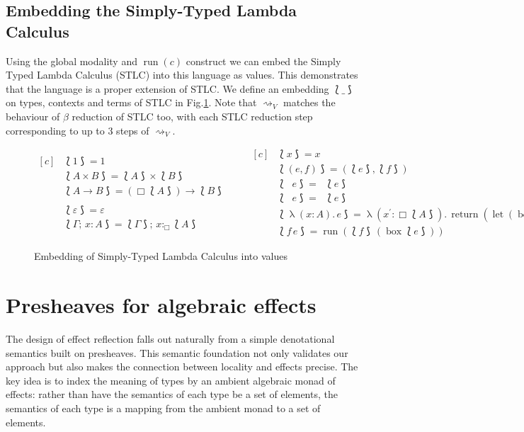 \documentclass[acmsmall, screen, review, anonymous]{acmart}
\theoremstyle{definition}
\newcommand{\glob}{\mathop{\Box}}
\newcommand{\fst}{\mathop{\pi_1}}
\newcommand{\snd}{\mathop{\pi_2}}
\newcommand{\abs}[3]{\mathop{\lambda}(#1 \types #2).\,#3}
\newcommand{\app}[2]{#1\,#2}
\newcommand{\types}{\mathrel{:}}
\newcommand{\gtypes}{\mathrel{:_{\Box}}}
\newcommand{\cempty}{\varepsilon}
\newcommand{\ccons}[2]{#1;\,#2}
\newcommand{\lbind}[3]{\ccons{#1}{#2\types#3}}
\newcommand{\gbind}[3]{\ccons{#1}{#2\gtypes#3}}
\newcommand{\return}[1]{\mathop{\mathrm{return}} #1}
\newcommand{\gbox}[1]{\mathop{\mathrm{box}} #1}
\newcommand{\gunbox}[3]{\mathop{\mathrm{let}} (\gbox #1) = #2 \mathop{\mathrm{in}} #3}
\newcommand{\grun}[1]{\mathop{\mathrm{run}}(#1)}
\newcommand{\reducestov}{\rightsquigarrow_V}
\newcommand{\embed}[1]{\mathopen{\lbag}#1\mathclose{\rbag}}
\begin{document}
\subsection{Embedding the Simply-Typed Lambda Calculus}

Using the global modality and $\grun{c}$ construct we can embed the
Simply Typed Lambda Calculus (STLC) into this language as values. This
demonstrates that the language is a proper extension of STLC. We define
an embedding $\embed{\_}$ on types, contexts and terms of STLC in
Fig.\ref{fig:stlc}. Note that $\reducestov$ matches the behaviour of
$\beta$ reduction of STLC too, with each STLC reduction step
corresponding to up to 3 steps of $\reducestov$.
\begin{figure}
\begin{equation*}
\begin{aligned}[c]
  &\embed{1} = 1 \\
  &\embed{A \times B} = \embed{A} \times \embed{B} \\
  &\embed{A \rightarrow B} = (\glob \embed{A}) \rightarrow \embed{B} \\ \\
  &\embed{\cempty} = \cempty \\
  &\embed{\lbind{\Gamma}{x}{A}} = \gbind{\embed{\Gamma}}{x}{\embed{A}}
\end{aligned}
\qquad
\begin{aligned}[c]
  &\embed{x} = x \\
  &\embed{(e, f)} = (\embed{e}, \embed{f}) \\
  &\embed{\fst{e}} = \fst{\embed{e}} \\
  &\embed{\snd{e}} = \snd{\embed{e}} \\
  &\embed{\abs{x}{A}{e}} =
    \abs{x^{\prime}}{\glob \embed{A}}{\return{(\gunbox{x}{x^{\prime}}{\embed{e}})}} \\
  &\embed{\app{f}{e}} = \grun{\app{\embed{f}}{(\gbox{\embed{e}})}}
\end{aligned}
\end{equation*}
\caption{Embedding of Simply-Typed Lambda Calculus into values}
\label{fig:stlc}
\end{figure}

\section{Presheaves for algebraic effects}
\label{sec:semantics}

The design of effect reflection falls out naturally from a simple
denotational semantics built on presheaves. This semantic foundation not
only validates our approach but also makes the connection between
locality and effects precise. The key idea is to index the meaning of
types by an ambient algebraic monad of effects: rather than have the
semantics of each type be a set of elements, the semantics of each type
is a mapping from the ambient monad to a set of elements.
\end{document}
